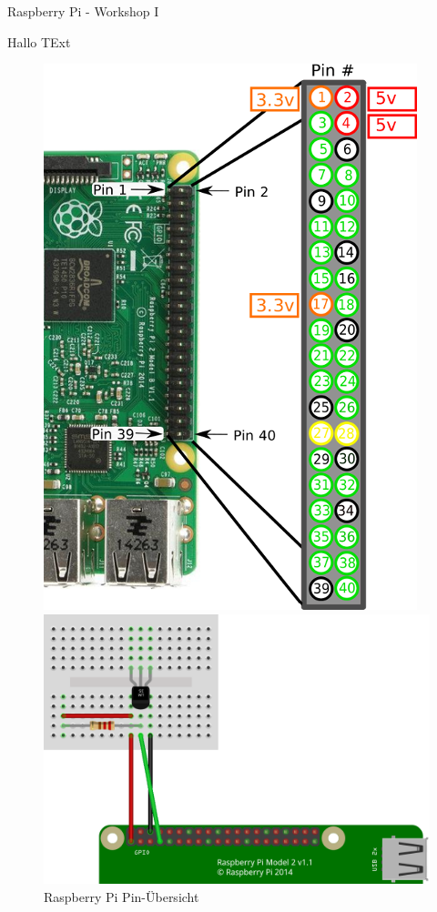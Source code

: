 \documentclass{\VorlagenPfad/coderdojokatext}
\renewcommand{\Titel}{Raspberry Pi - Workshop I}
\begin{document}
\begin{center}
	{\huge \Titel}
\end{center}

\begin{minipage}[t]{0.45\linewidth}
Hallo TExt
\end{minipage}

\begin{figure}[htb]
	\centering
	\begin{minipage}[t]{0.45\linewidth}
		\centering
		\includegraphics[width=.9\textwidth]{pin_layout.png}
		\caption{Raspberry Pi Pin-Übersicht}
	\end{minipage}%
	\hfill
	\begin{minipage}[t]{0.45\linewidth}
		\centering
		\includegraphics[width=.9\textwidth]{temperatur/temperatur.png}

\end{minipage}
\end{figure}
\end{document}
